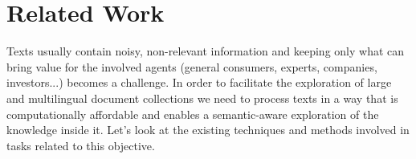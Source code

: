 

\chapter{Related Work}\label{ch:soa}

\graphicspath{{soa/figures/}}


Texts usually contain noisy, non-relevant information and keeping only what can bring value for the involved agents (general consumers, experts, companies, investors...) becomes a challenge. In order to facilitate the exploration of large and multilingual document collections we need to process texts in a way that is computationally affordable and enables a semantic-aware exploration of the knowledge inside it. Let's look at the existing techniques and methods involved in tasks related to this objective. 

 



